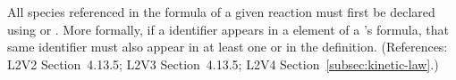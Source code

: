 All species referenced in the \KineticLaw formula of a given reaction must
first be declared using \SpeciesReference or \ModifierSpeciesReference.
More formally, if a \Species identifier appears in a  element of
a \Reaction's \KineticLaw formula, that same identifier must also appear in
at least one \SpeciesReference or \ModifierSpeciesReference in the
\Reaction definition.  (References: L2V2 Section~4.13.5; L2V3
Section~4.13.5; L2V4 Section~\ref{subsec:kinetic-law}.)
